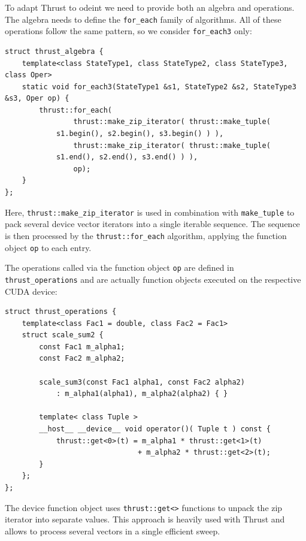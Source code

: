\documentclass[final]{siamltex}
\newcommand{\code}[1]{\lstinline|#1|}
\begin{document}
To adapt Thrust to odeint we need to provide both an algebra and
operations. The algebra needs to define the \code{for_each} family of
algorithms. All of these operations follow the same pattern,
so we consider \code{for_each3} only:
\begin{lstlisting}
struct thrust_algebra {
    template<class StateType1, class StateType2, class StateType3, class Oper>
    static void for_each3(StateType1 &s1, StateType2 &s2, StateType3 &s3, Oper op) {
        thrust::for_each(
                thrust::make_zip_iterator( thrust::make_tuple(
 		    s1.begin(), s2.begin(), s3.begin() ) ),
                thrust::make_zip_iterator( thrust::make_tuple(
		    s1.end(), s2.end(), s3.end() ) ),
                op);
    }
};
\end{lstlisting}
Here, \code{thrust::make_zip_iterator} is used in combination with \code{make_tuple}
to pack several device vector iterators into a single iterable sequence.
The sequence is then processed by the \code{thrust::for_each} algorithm, applying the function object
\code{op} to each entry.

The operations called via the function object \code{op} are defined in \code{thrust_operations}
and are actually function objects executed on the respective CUDA device:
\begin{lstlisting}
struct thrust_operations {
    template<class Fac1 = double, class Fac2 = Fac1>
    struct scale_sum2 {
        const Fac1 m_alpha1;
        const Fac2 m_alpha2;

        scale_sum3(const Fac1 alpha1, const Fac2 alpha2)
            : m_alpha1(alpha1), m_alpha2(alpha2) { }

        template< class Tuple >
        __host__ __device__ void operator()( Tuple t ) const {
            thrust::get<0>(t) = m_alpha1 * thrust::get<1>(t)
                               + m_alpha2 * thrust::get<2>(t);
        }
    };
};
\end{lstlisting}
The device function object uses \code{thrust::get<>} functions to unpack the zip iterator into separate values.
This approach is heavily used with Thrust and allows to process several vectors
in a single efficient sweep.
\end{document}
